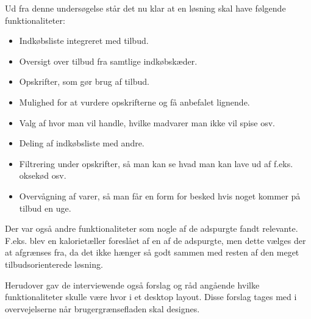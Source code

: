 
Ud fra denne undersøgelse står det nu klar at en løsning skal have følgende funktionaliteter:

\begin{itemize}
	\item Indkøbsliste integreret med tilbud.
	\item Oversigt over tilbud fra samtlige indkøbskæder.
	\item Opskrifter, som gør brug af tilbud.
	\item Mulighed for at vurdere opskrifterne og få anbefalet lignende.
	\item Valg af hvor man vil handle, hvilke madvarer man ikke vil spise osv.
	\item Deling af indkøbsliste med andre.
	\item Filtrering under opskrifter, så man kan se hvad man kan lave ud af f.eks. oksekød osv.
	\item Overvågning af varer, så man får en form for besked hvis noget kommer på tilbud en uge.
\end{itemize}

Der var også andre funktionaliteter som nogle af de adspurgte fandt relevante.
F.eks. blev en kalorietæller foreslået af en af de adspurgte, men dette vælges der at afgrænses fra, da det ikke hænger så godt sammen med resten af den meget tilbudsorienterede løsning.

Herudover gav de interviewende også forslag og råd angående hvilke funktionaliteter skulle være hvor i et desktop layout.
Disse forslag tages med i overvejelserne når brugergrænsefladen skal designes.
